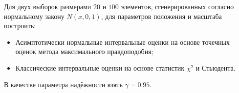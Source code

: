 \documentclass[../body.tex]{subfiles}
\begin{document}
	 Для двух выборок размерами $20$ и $100$ элементов, сгенерированных согласно нормальному закону $N(x,0,1)$, для параметров положения и масштаба построить:
	 \begin{itemize}
	 	\item Асимптотически нормальные интервальные оценки на основе точечных оценок метода максимального правдоподобия;
	 	\item Классические интервальные оценки на основе статистик $\chi^{2}$ и Стьюдента.
	 \end{itemize}
 	 В качестве параметра надёжности взять $\gamma = 0.95$.
	
\end{document}
